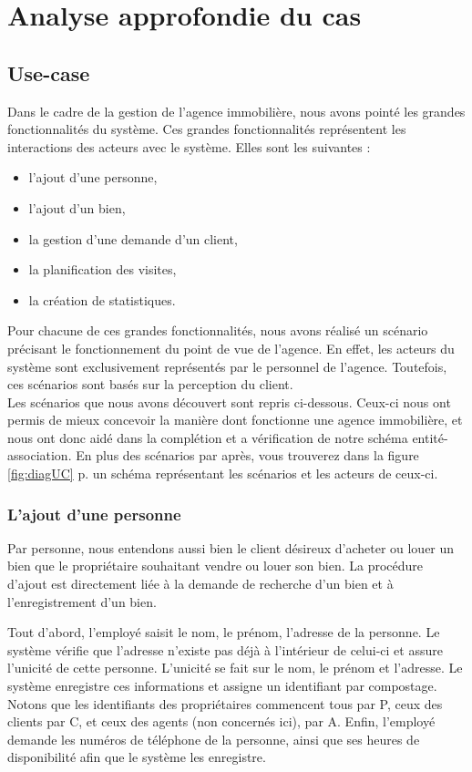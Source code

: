 \section{Analyse approfondie du cas}

\subsection{Use-case}
Dans le cadre de la gestion de l'agence immobilière, nous avons pointé les grandes fonctionnalités du système. Ces grandes fonctionnalités représentent les interactions des acteurs avec le système.
Elles sont les suivantes :
\begin{itemize}
	\item l'ajout d'une personne,
	\item l'ajout d'un bien,
	\item la gestion d'une demande d'un client,
	\item la planification des visites,
	\item la création de statistiques.
\end{itemize}
Pour chacune de ces grandes fonctionnalités, nous avons réalisé un scénario précisant le fonctionnement du point de vue de l'agence. En effet, les acteurs du système sont exclusivement représentés par le personnel de l'agence.
Toutefois, ces scénarios sont basés sur la perception du client.\\

Les scénarios que nous avons découvert sont repris ci-dessous. Ceux-ci nous ont permis de mieux concevoir la manière dont fonctionne une agence immobilière, et nous ont donc aidé dans la complétion et a vérification de notre schéma entité-association. En plus des scénarios par après, vous trouverez dans la figure \ref{fig:diagUC} p.\pageref{fig:diagUC} un schéma représentant les scénarios et les acteurs de ceux-ci.

\subsubsection{L'ajout d'une personne}
Par personne, nous entendons aussi bien le client désireux d'acheter ou louer un bien que le propriétaire souhaitant vendre ou louer son bien.
La procédure d'ajout est directement liée à la demande de recherche d'un bien et à l'enregistrement d'un bien.

Tout d'abord, l'employé saisit le nom, le prénom, l'adresse de la personne.
Le système vérifie que l'adresse n'existe pas déjà à l'intérieur de celui-ci et assure l'unicité de cette personne. L'unicité se fait sur le nom, le prénom et l'adresse.
Le système enregistre ces informations et assigne un identifiant par compostage. Notons que les identifiants des propriétaires commencent tous par P, ceux des clients par C, et ceux des agents (non concernés ici), par A.
Enfin, l'employé demande les numéros de téléphone de la personne, ainsi que ses heures de disponibilité afin que le système les enregistre.

